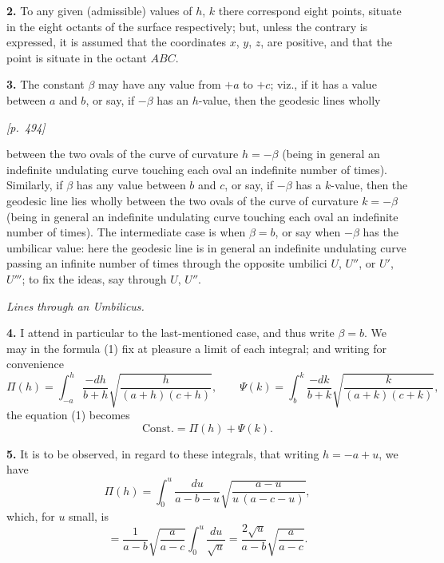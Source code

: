 \documentclass[11pt]{article}
\begin{document}
\medskip

\textbf{2.} To any given (admissible) values of $h$, $k$ there correspond
eight points, situate in the eight octants of the surface respectively; but,
unless the contrary is expressed, it is assumed that the coordinates $x$,
$y$, $z$, are positive, and that the point is situate in the octant $ABC$.

\textbf{3.} The constant $\beta$ may have any value from $+a$ to $+c$; viz.,
if it has a value between $a$ and $b$, or say, if $-\beta$ has an
$h$-value, then the geodesic lines wholly

\medskip

\noindent\textit{[p.~494]}

\medskip

\noindent
between the two ovals of the curve of curvature $h=-\beta$ (being in
general an indefinite undulating curve touching each oval an indefinite
number of times). Similarly, if $\beta$ has any value between $b$ and $c$,
or say, if $-\beta$ has a $k$-value, then the geodesic line lies wholly
between the two ovals of the curve of curvature $k=-\beta$ (being in
general an indefinite undulating curve touching each oval an indefinite
number of times). The intermediate case is when $\beta=b$, or say when
$-\beta$ has the umbilicar value: here the geodesic line is in general an
indefinite undulating curve passing an infinite number of times through the
opposite umbilici $U$, $U''$, or $U'$, $U'''$; to fix the ideas, say
through $U$, $U''$.

\medskip

\begin{center}\textit{Lines through an Umbilicus.}\end{center}

\medskip

\textbf{4.} I attend in particular to the last-mentioned case, and thus
write $\beta=b$. We may in the formula (1) fix at pleasure a limit of each
integral; and writing for convenience
\[
\Pi(h)=\int_{-a}^{h}\frac{-dh}{b+h}\sqrt{\frac{h}{(a+h)(c+h)}},\qquad
\Psi(k)=\int_{b}^{k}\frac{-dk}{b+k}\sqrt{\frac{k}{(a+k)(c+k)}},
\]
the equation (1) becomes
\[
\mathrm{Const.}=\Pi(h)+\Psi(k).
\]

\textbf{5.} It is to be observed, in regard to these integrals, that
writing $h=-a+u$, we have
\[
\Pi(h)=\int_{0}^{u}\frac{du}{a-b-u}\sqrt{\frac{a-u}{u\,(a-c-u)}},
\]
which, for $u$ small, is
\[
=\frac{1}{a-b}\sqrt{\frac{a}{a-c}}\int_{0}^{u}\frac{du}{\sqrt{u}}
=\frac{2\sqrt{u}}{a-b}\sqrt{\frac{a}{a-c}}.
\]
\end{document}
